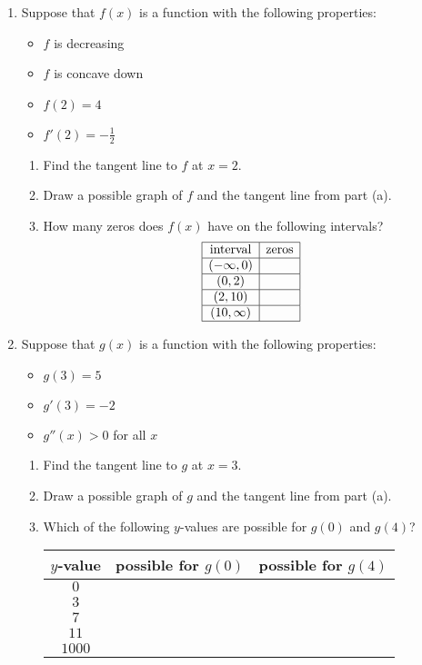 \documentclass[11pt]{article}
\begin{document}
\begin{enumerate}
\newpage

\item Suppose that $f(x)$ is a function with the following properties:
  \begin{itemize}
  \item $f$ is decreasing
  \item $f$ is concave down
  \item $f(2)=4$
  \item $f'(2)=-\frac{1}{2}$
  \end{itemize}

  \begin{enumerate}
  \item Find the tangent line to $f$ at $x=2$.
    \vfill
  \item Draw a possible graph of $f$ and the tangent line from part
    (a).
    \vfill
  \item How many zeros does $f(x)$ have on the following intervals?
   \[
     \begin{array}{|c|c|}
       \hline
       \mbox{interval} & \mbox{zeros}\\
       \hline
       (-\infty,0)&\\
       \hline
       (0,2)&\\
       \hline
       (2,10)&\\
       \hline
       (10,\infty)&\\
       \hline
     \end{array}
   \]
   \end{enumerate}
  \newpage
\item Suppose that $g(x)$ is a function with the following
   properties:
  \begin{itemize}
  \item $g(3)=5$
  \item $g'(3)=-2$
  \item $g''(x)>0$ for all $x$
  \end{itemize}

  \begin{enumerate}
  \item Find the tangent line to $g$ at $x=3$.
    \vfill
  \item Draw a possible graph of $g$ and the tangent line from part
    (a).
    \vfill
  \item Which of the following $y$-values are possible for $g(0)$ and $g(4)$?
    \begin{center}
      \begin{tabular}{|c|c|c|}
        \hline
        $y$-value & possible for $g(0)$ & possible for $g(4)$\\
        \hline
        $0$&&\\
        \hline
        $3$&&\\
        \hline
        $7$&&\\
        \hline
        $11$&&\\
        \hline
        $1000$&&\\
        \hline
      \end{tabular}
    \end{center}
  \end{enumerate}

\end{enumerate}
\end{document}

